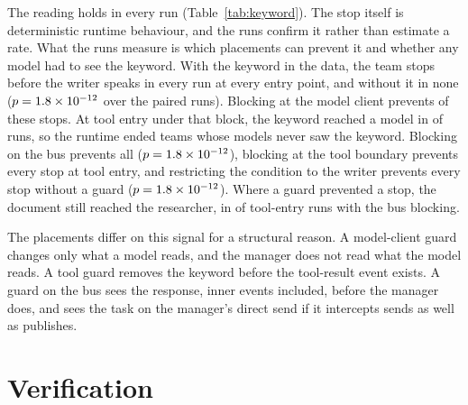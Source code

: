 \documentclass[conference]{IEEEtran}
\begin{document}
The reading holds in every run (Table~\ref{tab:keyword}). The stop itself is
deterministic runtime behaviour, and the runs confirm it rather than
estimate a rate. What the runs measure is which placements can prevent it
and whether any model had to see the keyword. With the keyword
in the data, the team stops before the writer speaks in every run at every
entry point, and without it in none ($p=1.8\times 10^{-12}{}$ over the paired
runs). Blocking at the model client prevents \TenBlockModelAllPrevented{} of
these stops. At tool entry under that block, the keyword reached a model in
\TenBlockModelToolKeywordReachedModelK{} of
\TenBlockModelToolKeywordReachedModelN{} runs, so the runtime ended teams
whose models never saw the keyword. Blocking on the bus prevents
all \TenBlockBusAllPrevented{} ($p=1.8\times 10^{-12}{}$), blocking at the tool
boundary prevents every stop at tool entry, and restricting the condition to
the writer prevents every stop without a guard ($p=1.8\times 10^{-12}{}$).
Where a guard prevented a stop, the document still reached the researcher,
in \TenBlockBusToolDocReachedK{} of \TenBlockBusToolDocReachedN{} tool-entry
runs with the bus blocking.

\begin{table}[t]
\centering
\caption{Runs that stop before the writer speaks, per condition and entry
point, \NTestCarriers{} carriers each. The keyword is appended to a benign
passage and carries no instruction to any model.}
\scriptsize
\setlength{\tabcolsep}{3pt}

\label{tab:keyword}
\end{table}

The placements differ on this signal for a structural reason. A
model-client guard changes only what a model reads, and the manager does not
read what the model reads. A tool guard removes the keyword before the
tool-result event exists. A guard on the bus sees the response, inner events
included, before the manager does, and sees the task on the manager's direct
send if it intercepts sends as well as publishes.

\section{Verification}
\label{sec:verify}
\end{document}
